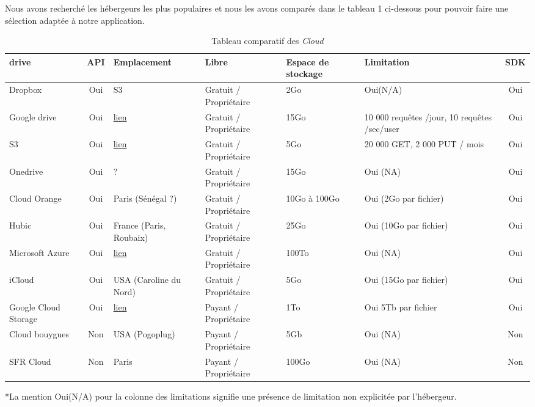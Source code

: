\documentclass[10pt]{article}
\begin{document}
Nous avons recherché les hébergeurs les plus populaires et nous les avons comparés dans le tableau 1 ci-dessous pour pouvoir faire une sélection adaptée à notre application.

\begin{table}[!h] \caption{Tableau comparatif des \textit{Cloud}}
\renewcommand{\arraystretch}{1.5} \begin{center}
\begin{tabular}{|m{1in}|c|m{1in}|m{1in}|m{1in}|m{1in}|c|} \hline \bf\centering
drive & \bf API & \bf Emplacement & \bf Libre & \bf\centering Espace de
stockage & \bf Limitation & \bf SDK\\ \hline \centering Dropbox & Oui & S3 &
Gratuit / Propriétaire & 2Go & Oui(N/A) & Oui \\ \hline \centering Google drive
& Oui  &
\href{http://www.google.com/about/datacenters/inside/locations/index.html}{lien}
& Gratuit / Propriétaire & 15Go & 10 000 requêtes /jour, 10 requêtes /sec/user
& Oui \\ \hline \centering S3 & Oui  &
\href{http://aws.amazon.com/fr/about-aws/global-infrastructure/}{lien} &
Gratuit / Propriétaire & 5Go & 20 000 GET, 2 000 PUT / mois & Oui \\ \hline
\centering Onedrive & Oui  & ? & Gratuit / Propriétaire & 15Go & Oui (NA) & Oui
\\ \hline \centering Cloud Orange & Oui  & Paris (Sénégal ?) & Gratuit /
Propriétaire & 10Go à 100Go & Oui (2Go par fichier) & Oui \\ \hline \centering
Hubic & Oui  & France (Paris, Roubaix) & Gratuit / Propriétaire & 25Go & Oui
(10Go par fichier) & Oui \\ \hline \centering Microsoft Azure & Oui  &
\href{http://azure.microsoft.com/en-us/regions/}{lien} & Gratuit / Propriétaire
& 100To & Oui (NA) & Oui \\ \hline \centering iCloud & Oui  & USA (Caroline du
Nord) & Gratuit / Propriétaire & 5Go & Oui (15Go par fichier) & Oui \\ \hline
\centering Google Cloud Storage & Oui  &
\href{http://www.google.com/about/datacenters/inside/locations/index.html}{lien}
& Payant  / Propriétaire & 1To & Oui 5Tb par fichier & Oui \\ \hline \centering
Cloud bouygues & Non  & USA (Pogoplug) & Payant  / Propriétaire & 5Gb & Oui
(NA) & Non \\ \hline \centering SFR Cloud & Non & Paris & Payant / Propriétaire
& 100Go & Oui (NA) & Non \\ \hline \end{tabular} \end{center} \end{table} *La
mention Oui(N/A) pour la colonne des limitations signifie une présence de
limitation non explicitée par l'hébergeur.\\
\end{document}

